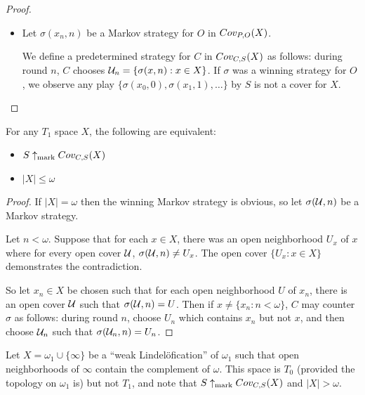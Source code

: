 \begin{proof}
\begin{itemize}
      \item
      Let $\sigma(x_n,n)$ be a Markov strategy for $O$ in $Cov_{P,O}(X)$.

      We define a predetermined strategy for $C$ in $Cov_{C,S}(X)$ as follows: during round $n$, $C$ chooses $\mathcal{U}_n = \{\sigma(x,n) : x\in X\}$. If $\sigma$ was a winning strategy for $O$, we observe any play $\{\sigma(x_0,0),\sigma(x_1,1),\dots\}$ by $S$ is not a cover for $X$.

    \end{itemize}

  \end{proof}

  \begin{theorem}
  For any $T_1$ space $X$, the following are equivalent:
    \begin{itemize}
      \item $S\uparrow_{\text{mark}}Cov_{C,S}(X)$
      \item $|X|\leq\omega$
    \end{itemize}
  \end{theorem}

  \begin{proof}
    If $|X|=\omega$ then the winning Markov strategy is obvious, so let $\sigma(\mathcal{U},n)$ be a Markov strategy.

    Let $n<\omega$. Suppose that for each $x\in X$, there was an open neighborhood $U_x$ of $x$ where for every open cover $\mathcal{U}$, $\sigma(\mathcal{U},n) \not= U_x$. The open cover $\{U_x : x\in X\}$ demonstrates the contradiction.

    So let $x_n\in X$ be chosen such that for each open neighborhood $U$ of $x_n$, there is an open cover $\mathcal{U}$ such that $\sigma(\mathcal{U},n)=U$. Then if $x\not=\{x_n : n<\omega\}$, $C$ may counter $\sigma$ as follows: during round $n$, choose $U_n$ which contains $x_n$ but not $x$, and then choose $\mathcal{U}_n$ such that $\sigma(\mathcal{U}_n,n)=U_n$.
  \end{proof}


  \begin{example}
    Let $X=\omega_1\cup\{\infty\}$ be a ``weak Lindel\"ofication'' of $\omega_1$ such that open neighborhoods of $\infty$ contain the complement of $\omega$. This space is $T_0$ (provided the topology on $\omega_1$ is) but not $T_1$, and note that $S\uparrow_{\text{mark}}Cov_{C,S}(X)$ and $|X|>\omega$.
  \end{example}

